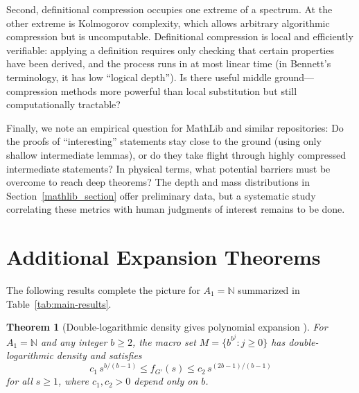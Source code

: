 \documentclass[12pt]{amsart}
\newcommand{\N}{\mathbb{N}}
\newtheorem{theorem}{Theorem}
\theoremstyle{definition}
\theoremstyle{remark}
\begin{document}
Second, definitional compression occupies one extreme of a spectrum.
At the other extreme is Kolmogorov complexity, which allows arbitrary algorithmic compression but is uncomputable.
Definitional compression is local and efficiently verifiable: applying a definition requires only checking that certain properties have been derived, and the process runs in at most linear time (in Bennett's~\cite{BennettDepth} terminology, it has low ``logical depth'').
Is there useful middle ground—compression methods more powerful than local substitution but still computationally tractable?

Finally, we note an empirical question for MathLib and similar repositories: Do the proofs of ``interesting'' statements stay close to the ground (using only shallow intermediate lemmas), or do they take flight through highly compressed intermediate statements?
In physical terms, what potential barriers must be overcome to reach deep theorems?
The depth and mass distributions in Section~\ref{mathlib_section} offer preliminary data, but a systematic study correlating these metrics with human judgments of interest remains to be done.



\appendix

\section{Additional Expansion Theorems}
\label{appendix:additional-theorems}

The following results complete the picture for $A_1 = \N$ summarized in Table~\ref{tab:main-results}.

\begin{theorem}[Double-logarithmic density gives polynomial expansion ]\label{thm:abelian-double-log}
For $A_1 = \mathbb{N}$ and any integer $b \geq 2$, the macro set $M = \{ b^{b^j} : j \geq 0 \}$ has double-logarithmic density and satisfies
\[
c_1 \, s^{b/(b-1)} \leq f_{G'}(s) \leq c_2 \, s^{(2b-1)/(b-1)}
\]
for all $s \geq 1$, where $c_1, c_2 > 0$ depend only on $b$.
\end{theorem}
\end{document}
